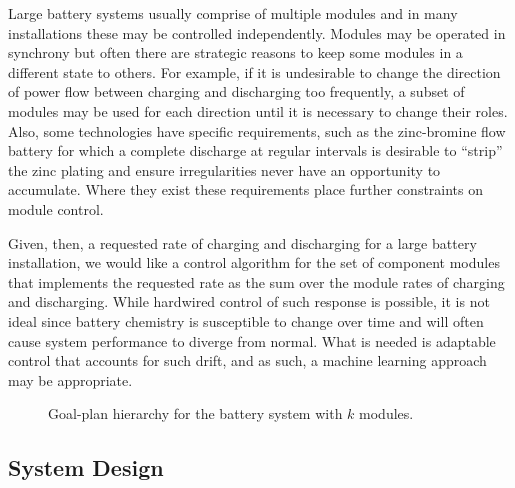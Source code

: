 Large battery systems usually comprise of multiple modules and in many installations these may be controlled independently.  Modules may be operated in synchrony but often there are strategic reasons to keep some modules in a different state to others.  For example, if it is undesirable to change the direction of power flow between charging and discharging too frequently, a subset of modules may be used for each direction until it is necessary to change their roles.  Also, some technologies have specific requirements, such as the zinc-bromine flow battery for which a complete discharge at regular intervals is desirable to ``strip'' the zinc plating and ensure irregularities never have an opportunity to accumulate.  Where they exist these requirements place further constraints on module control.

Given, then, a requested rate of charging and discharging for a large battery installation, we would like a control algorithm for the set of component modules that implements the requested rate as the sum over the module rates of charging and discharging.  While hardwired control of such response is possible, it is not ideal since battery chemistry is susceptible to change over time and will often cause system performance to diverge from normal. What is needed is adaptable control that accounts for such drift, and as such, a  machine learning approach may be appropriate. 

\begin{figure*}[ht]
\begin{center}

\end{center}
\caption{Goal-plan hierarchy for the battery system with $k$ modules.}
\label{fig:gptree}
\end{figure*}


\subsection{System Design}\label{subsec:design}

